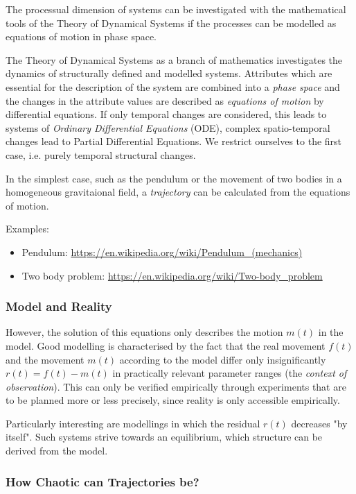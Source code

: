 \documentclass[11pt,a4paper]{article}
\begin{document}
The processual dimension of systems can be investigated with the mathematical
tools of the Theory of Dynamical Systems if the processes can be modelled as
equations of motion in phase space.

The Theory of Dynamical Systems as a branch of mathematics investigates the
dynamics of structurally defined and modelled systems. Attributes which are
essential for the description of the system are combined into a \emph{phase
  space} and the changes in the attribute values are described as
\emph{equations of motion} by differential equations. If only temporal changes
are considered, this leads to systems of \emph{Ordinary Differential
  Equations} (ODE), complex spatio-temporal changes lead to Partial
Differential Equations. We restrict ourselves to the first case, i.e. purely
temporal structural changes.

In the simplest case, such as the pendulum or the movement of two bodies in a
homogeneous gravitaional field, a \emph{trajectory} can be calculated from the
equations of motion.

Examples:
\begin{itemize}
\item Pendulum: \url{https://en.wikipedia.org/wiki/Pendulum_(mechanics)}
\item Two body problem: \url{https://en.wikipedia.org/wiki/Two-body_problem}
\end{itemize}

\subsubsection{Model and Reality}

However, the solution of this equations only describes the motion $m(t)$ in
the model. Good modelling is characterised by the fact that the real movement
$f(t)$ and the movement $m(t)$ according to the model differ only
insignificantly $r(t)=f(t)-m(t)$ in practically relevant parameter ranges (the
\emph{context of observation}). This can only be verified empirically through
experiments that are to be planned more or less precisely, since reality is
only accessible empirically.

Particularly interesting are modellings in which the residual $r(t)$ decreases
"by itself". Such systems strive towards an equilibrium, which structure can
be derived from the model.

\subsubsection{How Chaotic can Trajectories be?} 
\end{document}
